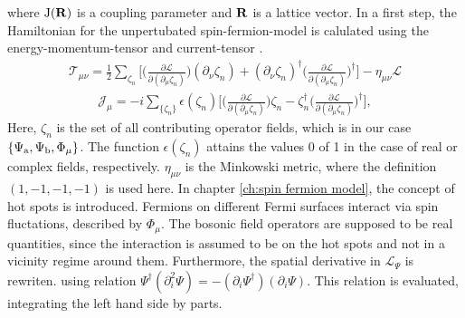 %
where $\mathrm{J}(\vb{R})$ is a coupling parameter and $\vb{R}$ is a lattice vector.
In a first step, the Hamiltonian for the unpertubated spin-fermion-model is calulated using the energy-momentum-tensor and current-tensor \cite{Iliev}.
%
\begin{align}
	\mathcal{T}_{\mu\nu} = 
		\frac{1}{2} \sum\limits_{\zeta_{n}} \bigg[ 
		\Big(\frac{\partial\mathcal{L}}{\partial(\partial_{\mu}\zeta_{n})}\Big) (\partial_{\nu}\zeta_{n}) 
		+
		(\partial_{\nu}\zeta_{n})^{\dag} \Big(\frac{\partial\mathcal{L}}{\partial(\partial_{\mu}\zeta_{n})}\Big)^{\dag}
		\bigg]
		-\eta_{\mu\nu}\mathcal{L}
\end{align}
%
%
\begin{align}
	\mathcal{J}_{\mu} = -i \sum\limits_{\{\zeta_{n}\}} \epsilon(\zeta_{n}) \bigg[
		\Big(\frac{\partial\mathcal{L}}{\partial(\partial_{\mu}\zeta_{n})}\Big) \zeta_{n}
		-
		\zeta_{n}^{\dag} \Big(\frac{\partial\mathcal{L}}{\partial(\partial_{\mu}\zeta_{n})}\Big)^{\dag}
		\bigg],
\end{align}
%
Here, $\zeta_{n}$ is the set of all contributing operator fields, which is in our case $\{\Psi_{\mathrm{a}},\Psi_{\mathrm{b}}, \Phi_{\mu}\}$.
The function $\epsilon(\zeta_{n})$ attains the values 0 of 1 in the case of real or complex fields, respectively.
$\eta_{\mu\nu}$ is the Minkowski metric, where the definition $(1,-1,-1,-1)$ is used here.
In chapter \ref{ch:spin fermion model}, the concept of hot spots is introduced.
Fermions on different Fermi surfaces interact via spin fluctations, described by $\Phi_{\mu}$.
The bosonic field operators are supposed to be real quantities, since the interaction is assumed to be on the hot spots and not in a vicinity regime around them.
Furthermore, the spatial derivative in $\mathcal{L}_{\Psi}$ is rewriten. using relation $\Psi^{\dag} (\partial_{i}^{2} \Psi) = -(\partial_{i} \Psi^{\dag}) (\partial_{i} \Psi)$.
This relation is evaluated, integrating the left hand side by parts.

